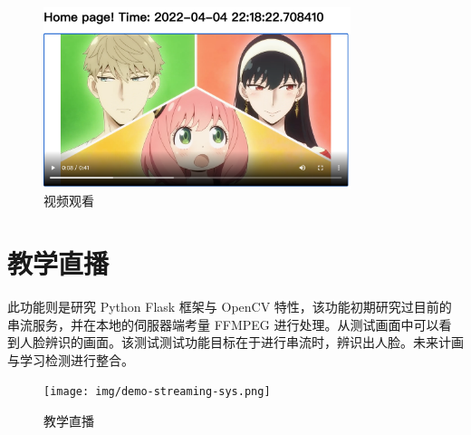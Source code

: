 \begin{figure}[htb]
\centering 
\includegraphics[width=0.80\textwidth]{img/demo-video-sys.png} 
\caption{视频观看}
\label{Test}
\end{figure}

\section{教学直播}

此功能则是研究 Python Flask 框架与 OpenCV 特性，该功能初期研究过目前的串流服务，并在本地的伺服器端考量 FFMPEG 进行处理。从测试画面中可以看到人脸辨识的画面。该测试测试功能目标在于进行串流时，辨识出人脸。未来计画与学习检测进行整合。

\begin{figure}[htb]
\centering 
\texttt{[image: img/demo-streaming-sys.png]} 
\caption{教学直播}
\label{Test}
\end{figure}
